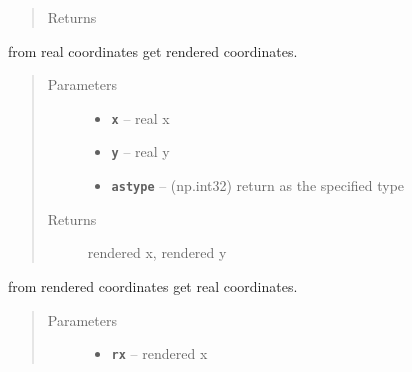 \documentclass[letterpaper,10pt,english]{sphinxmanual}
\begin{document}
\begin{fulllineitems}
\begin{fulllineitems}
\begin{quote}
\begin{description}
\item[{Returns}] \leavevmode


\end{description}\end{quote}

\end{fulllineitems}


\begin{fulllineitems}
\label{RRtoolbox.lib:RRtoolbox.lib.plotter.plotim.real2render}
from real coordinates get rendered coordinates.
\begin{quote}\begin{description}
\item[{Parameters}] \leavevmode\begin{itemize}
\item {} 
\textbf{\texttt{x}} -- real x

\item {} 
\textbf{\texttt{y}} -- real y

\item {} 
\textbf{\texttt{astype}} -- (np.int32) return as the specified type

\end{itemize}

\item[{Returns}] \leavevmode
rendered x, rendered y

\end{description}\end{quote}

\end{fulllineitems}


\begin{fulllineitems}
\label{RRtoolbox.lib:RRtoolbox.lib.plotter.plotim.render2real}
from rendered coordinates get real coordinates.
\begin{quote}\begin{description}
\item[{Parameters}] \leavevmode\begin{itemize}
\item {} 
\textbf{\texttt{rx}} -- rendered x


\end{itemize}
\end{description}
\end{quote}
\end{fulllineitems}
\end{fulllineitems}
\end{document}
